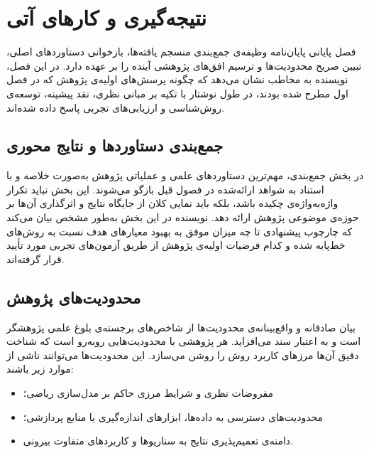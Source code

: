 

\chapter{نتیجه‌گیری و کارهای آتی}\label{chap:chapter6_conclusions}

فصل پایانی پایان‌نامه وظیفه‌ی جمع‌بندی منسجم یافته‌ها، بازخوانی دستاوردهای اصلی، تبیین صریح محدودیت‌ها و ترسیم افق‌های پژوهشی آینده را بر عهده دارد. در این فصل، نویسنده به مخاطب نشان می‌دهد که چگونه پرسش‌های اولیه‌ی پژوهش که در فصل اول مطرح شده بودند، در طول نوشتار با تکیه بر مبانی نظری، نقد پیشینه، توسعه‌ی روش‌شناسی و ارزیابی‌های تجربی پاسخ داده شده‌اند.


\section{جمع‌بندی دستاوردها و نتایج محوری}\label{sec:6-1}

در بخش جمع‌بندی، مهم‌ترین دستاوردهای علمی و عملیاتی پژوهش به‌صورت خلاصه و با استناد به شواهد ارائه‌شده در فصول قبل بازگو می‌شوند. این بخش نباید تکرار واژه‌به‌واژه‌ی چکیده باشد، بلکه باید نمایی کلان از جایگاه نتایج و اثرگذاری آن‌ها بر حوزه‌ی موضوعی پژوهش ارائه دهد. نویسنده در این بخش به‌طور مشخص بیان می‌کند که چارچوب پیشنهادی تا چه میزان موفق به بهبود معیارهای هدف نسبت به روش‌های خط‌پایه شده و کدام فرضیات اولیه‌ی پژوهش از طریق آزمون‌های تجربی مورد تأیید قرار گرفته‌اند.


\section{محدودیت‌های پژوهش}\label{sec:6-2}

بیان صادقانه و واقع‌بینانه‌ی محدودیت‌ها از شاخص‌های برجسته‌ی بلوغ علمی پژوهشگر است و به اعتبار سند می‌افزاید. هر پژوهشی با محدودیت‌هایی روبه‌رو است که شناخت دقیق آن‌ها مرزهای کاربرد روش را روشن می‌سازد. این محدودیت‌ها می‌توانند ناشی از موارد زیر باشند:
\begin{itemize}
    \item مفروضات نظری و شرایط مرزی حاکم بر مدل‌سازی ریاضی؛
    \vspace{-0.25cm}
    \item محدودیت‌های دسترسی به داده‌ها، ابزارهای اندازه‌گیری یا منابع پردازشی؛
    \vspace{-0.25cm}
    \item دامنه‌ی تعمیم‌پذیری نتایج به سناریوها و کاربردهای متفاوت بیرونی.
\end{itemize}


